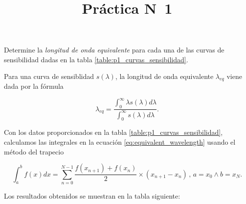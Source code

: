 \documentclass[12pt,a4paper]{practice}
\newcommand\integrate[4]{%
    \int_{#3}^{#4} {#1 d #2}
}
\newcommand\trapezerule[4]{%
    \sum_{n=#3}^{#4} {\frac{#1(#2_{n+1}) + #1(#2_n)}{2} \times (#2_{n+1} - #2_n)}
}
\begin{document}
    \title{Práctica N\textdegree\ 1}
    \maketitle

    \begin{problem}\label{prob:1}
        Determine la \emph{longitud de onda equivalente} para cada una de las curvas de sensibilidad dadas en la tabla \ref{table:p1_curvas_sensibilidad}.

        \begin{solution}
            Para una curva de sensiblidad $s\left(\lambda \right)$, la longitud de onda equivalente $\lambda_{eq}$ viene dada por la fórmula

            \begin{equation}\label{eq:equivalent_wavelength}
                \lambda_{eq} = \frac{\displaystyle\integrate{\lambda s(\lambda)}{\lambda}{0}{\infty} }{\displaystyle\integrate{s(\lambda)}{\lambda}{0}{\infty}}.
            \end{equation}

            Con los datos proporcionados en  la tabla \ref{table:p1_curvas_sensibilidad}, calculamos las integrales en la ecuación \ref{eq:equivalent_wavelength} usando el método del trapecio

            \begin{equation*}
                \integrate{f(x)}{x}{a}{b} = \trapezerule{f}{x}{0}{N-1}\,,\,a=x_{0} \wedge b = x_N.
            \end{equation*}

            Los resultados obtenidos se muestran en la tabla siguiente:


\end{solution}
\end{problem}
\end{document}
